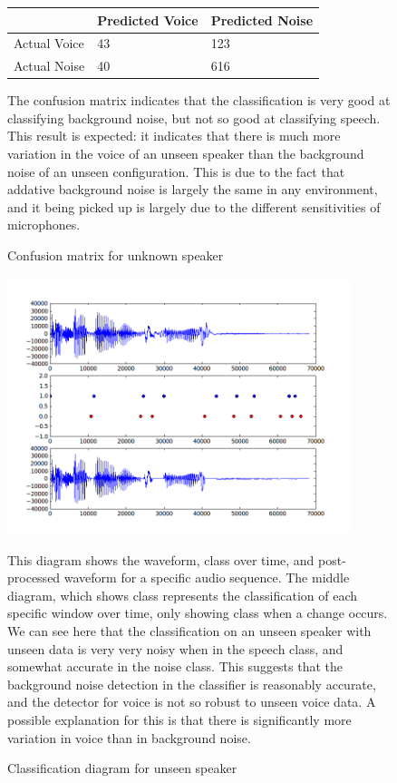 \documentclass[ %
                    author={Sam Phippen},
                supervisor={Dr. Rafal Bogacz},
                     title={Real time voice activity detectors in noisy personal computing environments},
                  subtitle={},
                    degree={MEng},
                      year={2012} ]{thesis}
\begin{document}
\begin{figure}
    \label{table:confusion_unseen}
    \begin{center}
        \begin{tabular}{| l | l | l |}
            \hline
            & Predicted Voice & Predicted Noise \\ \hline
            Actual Voice & 43 & 123 \\
            Actual Noise & 40 & 616 \\ \hline
        \end{tabular}
    \end{center}
    \vspace{\baselineskip}

    The confusion matrix indicates that the classification is very good at
    classifying background noise, but not so good at classifying speech. This
    result is expected: it indicates that there is much more variation in the
    voice of an unseen speaker than the background noise of an unseen
    configuration. This is due to the fact that addative background noise is
    largely the same in any environment, and it being picked up is largely due
    to the different sensitivities of microphones.

    \caption{Confusion matrix for unknown speaker}
\end{figure}

\begin{figure} \includegraphics[width=10cm]{peter.png}
    \label{fig:waveform_unseen}

    This diagram shows the waveform, class over
    time, and post-processed waveform for a specific audio sequence. The middle
    diagram, which shows class represents the classification of each specific
    window over time, only showing class when a change occurs. We can see here
    that the classification on an unseen speaker with unseen data is very very
    noisy when in the speech class, and somewhat accurate in the noise class.
    This suggests that the background noise detection in the classifier is
    reasonably accurate, and the detector for voice is not so robust to unseen
    voice data. A possible explanation for this is that there is significantly
    more variation in voice than in background noise.
    \caption{Classification diagram for unseen speaker}
\end{figure}
\end{document}
